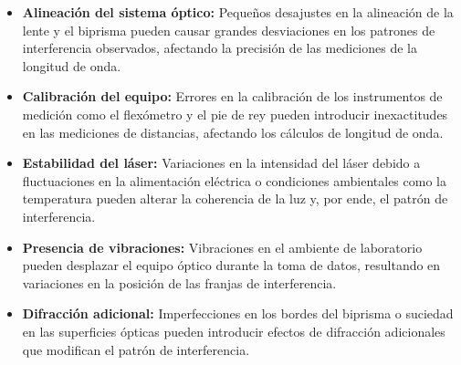 \begin{itemize}
    \item \textbf{Alineación del sistema óptico:} Pequeños desajustes en la alineación de la lente y el biprisma pueden causar grandes desviaciones en los patrones de interferencia observados, afectando la precisión de las mediciones de la longitud de onda.
    \item \textbf{Calibración del equipo:} Errores en la calibración de los instrumentos de medición como el flexómetro y el pie de rey pueden introducir inexactitudes en las mediciones de distancias, afectando los cálculos de longitud de onda.
    \item \textbf{Estabilidad del láser:} Variaciones en la intensidad del láser debido a fluctuaciones en la alimentación eléctrica o condiciones ambientales como la temperatura pueden alterar la coherencia de la luz y, por ende, el patrón de interferencia.
    \item \textbf{Presencia de vibraciones:} Vibraciones en el ambiente de laboratorio pueden desplazar el equipo óptico durante la toma de datos, resultando en variaciones en la posición de las franjas de interferencia.
    \item \textbf{Difracción adicional:} Imperfecciones en los bordes del biprisma o suciedad en las superficies ópticas pueden introducir efectos de difracción adicionales que modifican el patrón de interferencia.
\end{itemize}


